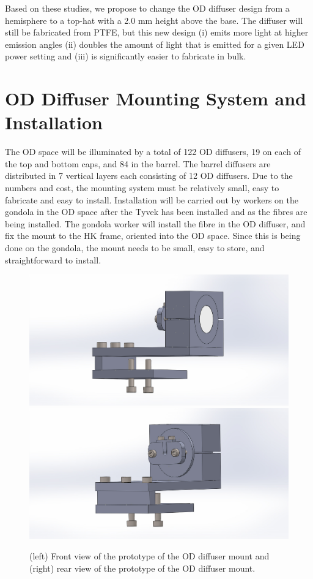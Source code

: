 \documentclass[a4paper,11pt]{article}
\begin{document}
Based on these studies, we propose to change the OD diffuser design from a hemisphere to a top-hat with a 2.0 mm height above the base. The diffuser will still be fabricated from PTFE, but this new design (i) emits more light at higher emission angles (ii) doubles the amount of light that is emitted for a given LED power setting and (iii) is significantly easier to fabricate in bulk.

\section{OD Diffuser Mounting System and Installation}

The OD space will be illuminated by a total of 122 OD diffusers, 19 on each of the top and bottom caps, and 84 in the barrel. The barrel diffusers are distributed in 7 vertical layers each consisting of 12 OD diffusers. Due to the numbers and cost, the mounting system must be relatively small, easy to fabricate and easy to install. Installation will be carried out by workers on the gondola in the OD space after the Tyvek has been installed and as the fibres are being installed. The gondola worker will install the fibre in the OD diffuser, and fix the mount to the HK frame, oriented into the OD space. Since this is being done on the gondola, the mount needs to be small, easy to store, and straightforward to install.

\begin{figure}
\centering 
\includegraphics[width=.49\textwidth]{Diffuser-and-mount-complete-top-hat.JPG}%
\includegraphics[width=.49\textwidth]{Diffuser-and-mount-complete-top-hat2.JPG}
\caption{(left) Front view of the prototype of the OD diffuser mount and (right) rear view of the prototype of the OD diffuser mount.}
\label{fig:od_diffuser_mount}
\end{figure}
\end{document}
